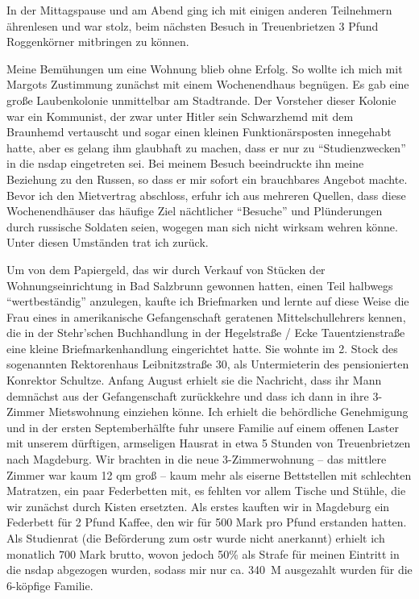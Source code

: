 \documentclass[a5paper,pagesize,10pt,twoside=true]{scrbook}
\renewcommand{\marginpar}[2][]{}
\begin{document}
In der Mittagspause und am Abend ging ich mit einigen anderen Teilnehmern ährenlesen und war stolz, beim nächsten Besuch in Treuenbrietzen 3 Pfund Roggenkörner mitbringen zu können.

Meine Bemühungen um eine Wohnung blieb ohne Erfolg. So wollte ich mich mit Margots Zustimmung zunächst mit einem Wochenendhaus begnügen. Es gab eine große Laubenkolonie unmittelbar am Stadtrande. Der Vorsteher dieser Kolonie war ein Kommunist, der zwar unter Hitler sein Schwarzhemd mit dem Braunhemd vertauscht und sogar einen kleinen Funktionärsposten innegehabt hatte, aber es gelang ihm glaubhaft zu machen, dass er nur zu \enquote{Studienzwecken} in die \ac{nsdap} eingetreten sei. Bei meinem Besuch beeindruckte ihn meine Beziehung zu den Russen, so dass er mir sofort ein brauchbares \marginpar{135} Angebot machte. Bevor ich den Mietvertrag abschloss, erfuhr ich aus mehreren Quellen, dass diese Wochenendhäuser das häufige Ziel nächtlicher \enquote{Besuche} und Plünderungen durch russische Soldaten seien, wogegen man sich nicht wirksam wehren könne. Unter diesen Umständen trat ich zurück.

Um von dem Papiergeld, das wir durch Verkauf von Stücken der Wohnungseinrichtung in Bad Salzbrunn gewonnen hatten, einen Teil halbwegs \enquote{wertbeständig} anzulegen, kaufte ich Briefmarken und lernte auf diese Weise die Frau eines in amerikanische Gefangenschaft geratenen Mittelschullehrers kennen, die in der Stehr'schen Buchhandlung in der Hegelstraße / Ecke Tauentzienstraße eine kleine Briefmarkenhandlung eingerichtet hatte. Sie wohnte im 2. Stock des sogenannten Rektorenhaus Leibnitzstraße 30, als Untermieterin des pensionierten Konrektor Schultze. Anfang August erhielt sie die Nachricht, dass ihr Mann demnächst aus der Gefangenschaft zurückkehre und dass ich dann in ihre 3-Zimmer Mietswohnung einziehen könne. Ich erhielt die behördliche Genehmigung und in der ersten Septemberhälfte fuhr unsere Familie auf einem offenen Laster mit unserem dürftigen, armseligen Hausrat in etwa 5 Stunden von Treuenbrietzen nach Magdeburg. Wir brachten in die neue 3-Zimmerwohnung -- das mittlere Zimmer war kaum 12 qm groß -- kaum mehr als eiserne Bettstellen mit schlechten Matratzen, ein paar Federbetten mit, es fehlten vor allem Tische und Stühle, die wir zunächst durch Kisten ersetzten. Als erstes kauften wir in Magdeburg ein Federbett für 2 Pfund Kaffee, den wir für 500 Mark pro Pfund erstanden hatten. Als Studienrat (die Beförderung zum \ac{ostr} wurde nicht anerkannt) erhielt ich monatlich 700 Mark brutto, wovon jedoch 50\% als Strafe für meinen Eintritt in die \ac{nsdap} abgezogen wurden, sodass mir nur ca. 340~M ausgezahlt wurden für die 6-köpfige Familie.
\end{document}
